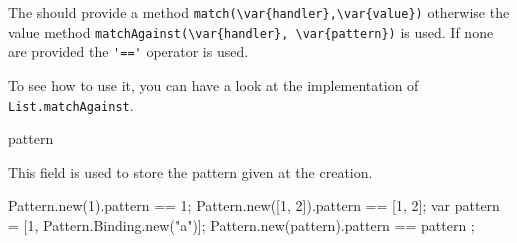 \begin{urbiscriptapi}
  The  should provide a method
  \lstinline|match(\var{handler},\var{value})| otherwise the value method
  \lstinline|matchAgainst(\var{handler}, \var{pattern})| is used.  If none
  are provided the \lstinline|'=='| operator is used.

  To see how to use it, you can have a look at the implementation of
  \lstinline|List.matchAgainst|.



\item[pattern]

  This field is used to store the pattern given at the creation.

\begin{urbiassert}
Pattern.new(1).pattern == 1;
Pattern.new([1, 2]).pattern == [1, 2];
{
  var pattern = [1, Pattern.Binding.new("a")];
  Pattern.new(pattern).pattern == pattern
};
\end{urbiassert}

\end{urbiscriptapi}

